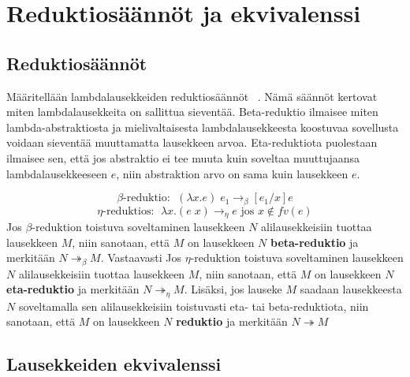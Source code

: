 \section{Reduktiosäännöt ja ekvivalenssi}

\subsection{Reduktiosäännöt}

Määritellään lambdalausekkeiden reduktiosäännöt ~\cite[s.~9]{Hudak89}. Nämä säännöt kertovat miten lambdalausekkeita on sallittua sieventää. Beta-reduktio ilmaisee miten lambda-abstraktiosta ja mielivaltaisesta lambdalausekkeesta koostuvaa sovellusta voidaan sieventää muuttamatta lausekkeen arvoa. Eta-reduktiota puolestaan ilmaisee sen, että jos abstraktio ei tee muuta kuin soveltaa muuttujaansa lambdalausekkeeseen $e$, niin abstraktion arvo on sama kuin lausekkeen $e$.     

\begin{maar}[reduktiosäännöt]	
\[\beta \text{-reduktio: } \; (\lambda x.e )\; e_{1} \rightarrow_{\beta} [e_{1} / x]e \]
\[\eta \text{-reduktios: } \; \lambda x.(e \; x) \rightarrow_{\eta} e \text{ jos } x \notin fv(e) \]	
Jos $\beta$-reduktion toistuva soveltaminen lausekkeen $N$ alilausekkeisiin tuottaa lausekkeen $M$, niin sanotaan, että $M$ on lausekkeen $N$ \textbf{beta-reduktio} ja merkitään $N  \twoheadrightarrow_{\beta} M$. Vastaavasti Jos $\eta$-reduktion toistuva soveltaminen lausekkeen $N$ alilausekkeisiin tuottaa lausekkeen $M$, niin sanotaan, että $M$ on lausekkeen $N$ \textbf{eta-reduktio} ja merkitään $N  \twoheadrightarrow_{\eta} M$. Lisäksi, jos lauseke $M$ saadaan lausekkeesta $N$ soveltamalla sen alilausekkeisiin toistuvasti eta- tai beta-reduktiota, niin sanotaan, että $M$ on lausekkeen $N$ \textbf{reduktio} ja merkitään $N  \twoheadrightarrow M$        
\end{maar}

\par

%

\subsection{Lausekkeiden ekvivalenssi}

